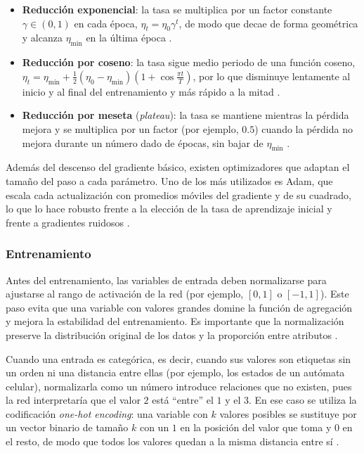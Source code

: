 \begin{itemize}
	\item \textbf{Reducción exponencial}: la tasa se multiplica por un factor constante $\gamma \in (0, 1)$ en cada época, $\eta_t = \eta_0 \gamma^t$, de modo que decae de forma geométrica y alcanza $\eta_{\min}$ en la última época \cite{goodfellow2016_dl}.
	\item \textbf{Reducción por coseno}: la tasa sigue medio periodo de una función coseno, $\eta_t = \eta_{\min} + \frac{1}{2} (\eta_0 - \eta_{\min}) \left( 1 + \cos \frac{\pi t}{T} \right)$, por lo que disminuye lentamente al inicio y al final del entrenamiento y más rápido a la mitad \cite{loshchilov2017_sgdr}.
	\item \textbf{Reducción por meseta} (\textit{plateau}): la tasa se mantiene mientras la pérdida mejora y se multiplica por un factor (por ejemplo, $0.5$) cuando la pérdida no mejora durante un número dado de épocas, sin bajar de $\eta_{\min}$ \cite{pytorch_1}.
\end{itemize}

Además del descenso del gradiente básico, existen optimizadores que adaptan el tamaño del paso a cada parámetro. Uno de los más utilizados es Adam, que escala cada actualización con promedios móviles del gradiente y de su cuadrado, lo que lo hace robusto frente a la elección de la tasa de aprendizaje inicial y frente a gradientes ruidosos \cite{kingma2015_adam}.

\subsubsection{Entrenamiento}

Antes del entrenamiento, las variables de entrada deben normalizarse para ajustarse al rango de activación de la red (por ejemplo, $[0,1]$ o $[-1,1]$). Este paso evita que una variable con valores grandes domine la función de agregación y mejora la estabilidad del entrenamiento. Es importante que la normalización preserve la distribución original de los datos y la proporción entre atributos \cite{matich2001_ann}.

Cuando una entrada es categórica, es decir, cuando sus valores son etiquetas sin un orden ni una distancia entre ellas (por ejemplo, los estados de un autómata celular), normalizarla como un número introduce relaciones que no existen, pues la red interpretaría que el valor $2$ está ``entre'' el $1$ y el $3$. En ese caso se utiliza la codificación \textit{one-hot encoding}: una variable con $k$ valores posibles se sustituye por un vector binario de tamaño $k$ con un $1$ en la posición del valor que toma y $0$ en el resto, de modo que todos los valores quedan a la misma distancia entre sí \cite{geron2019_hands_on}.

